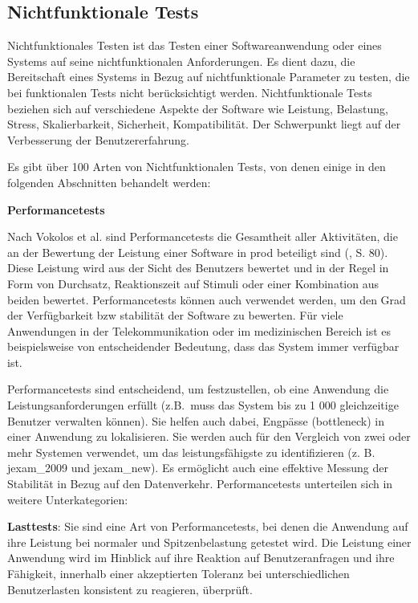 \subsection{Nichtfunktionale Tests}

Nichtfunktionales Testen ist das Testen einer Softwareanwendung oder
eines Systems auf seine nichtfunktionalen Anforderungen. Es dient dazu,
die Bereitschaft eines Systems in Bezug auf nichtfunktionale Parameter zu
testen, die bei funktionalen Tests nicht berücksichtigt werden.
Nichtfunktionale Tests beziehen sich auf verschiedene Aspekte der Software
wie Leistung, Belastung, Stress, Skalierbarkeit, Sicherheit, Kompatibilität.
Der Schwerpunkt liegt auf der Verbesserung der Benutzererfahrung.


Es gibt über 100 Arten von Nichtfunktionalen Tests, von denen einige in den
folgenden Abschnitten behandelt werden:

\textbf{Performancetests}

Nach Vokolos et al. sind Performancetests die Gesamtheit aller Aktivitäten,
die an der Bewertung der Leistung einer Software in \gls{prod}
beteiligt sind (\cite{vokolos1998performance}, S. 80).
Diese Leistung wird aus der Sicht des Benutzers bewertet und in der
Regel in Form von Durchsatz, Reaktionszeit auf Stimuli oder einer
Kombination aus beiden bewertet. Performancetests können auch verwendet
werden, um den Grad der Verfügbarkeit bzw stabilität der Software zu
bewerten. Für viele Anwendungen in der Telekommunikation oder im
medizinischen Bereich ist es beispielsweise von entscheidender Bedeutung,
dass das System immer verfügbar ist.


Performancetests sind entscheidend, um festzustellen, ob eine Anwendung die
Leistungsanforderungen erfüllt (z.B.\ muss das System bis zu 1 000
gleichzeitige Benutzer verwalten können). Sie helfen auch dabei, Engpässe
(\gls{bottleneck}) in einer Anwendung zu lokalisieren. Sie werden auch
für den Vergleich von zwei oder mehr Systemen verwendet, um das
leistungsfähigste zu identifizieren (z. B. \gls{jexam_2009}  und \gls{jexam_new}).
Es ermöglicht auch eine effektive Messung der Stabilität in Bezug auf den
Datenverkehr. Performancetests unterteilen sich in weitere Unterkategorien:


\textbf{Lasttests}: Sie sind eine Art von Performancetests,
bei denen die Anwendung auf ihre Leistung bei normaler und Spitzenbelastung
getestet wird. Die Leistung einer Anwendung wird im Hinblick auf ihre Reaktion
auf Benutzeranfragen und ihre Fähigkeit, innerhalb einer akzeptierten Toleranz
bei unterschiedlichen Benutzerlasten konsistent zu reagieren, überprüft.


